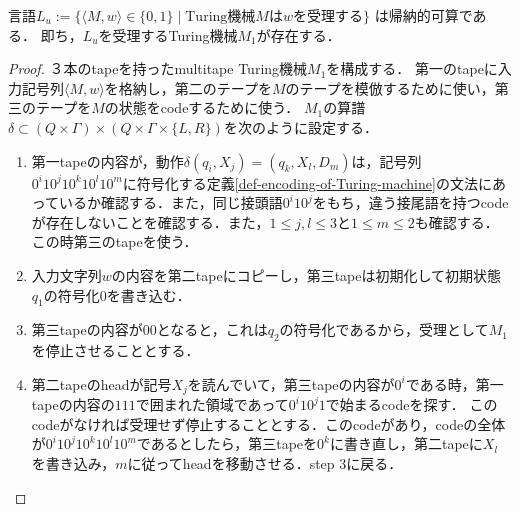 \documentclass[uplatex, dvipdfmx]{jsreport}
\begin{document}
\begin{theorem}[万能Turing機械の構成]\label{thm-existence-of-universal-Turing-machine}
    言語$L_u:=\{\langle M,w\rangle\in\{0,1\}\mid\mathrm{Turing}機械Mはwを受理する\}$
    は帰納的可算である．
    即ち，$L_u$を受理するTuring機械$M_1$が存在する．
\end{theorem}
\begin{proof}
    ３本のtapeを持ったmultitape Turing機械$M_1$を構成する．
    第一のtapeに入力記号列$\langle M,w\rangle$を格納し，第二のテープを$M$のテープを模倣するために使い，第三のテープを$M$の状態をcodeするために使う．
    $M_1$の算譜$\delta\subset (Q\times\Gamma)\times(Q\times\Gamma\times\{L,R\})$を次のように設定する．
    \begin{enumerate}
        \item 第一tapeの内容が，動作$\delta(q_i,X_j)=(q_k,X_l,D_m)$は，記号列$0^i10^j10^k10^l10^m$に符号化する定義\ref{def-encoding-of-Turing-machine}の文法にあっているか確認する．また，同じ接頭語$0^i10^j$をもち，違う接尾語を持つcodeが存在しないことを確認する．また，$1\le j,l\le 3$と$1\le m\le 2$も確認する．この時第三のtapeを使う．
        \item 入力文字列$w$の内容を第二tapeにコピーし，第三tapeは初期化して初期状態$q_1$の符号化$0$を書き込む．
        \item 第三tapeの内容が$00$となると，これは$q_2$の符号化であるから，受理として$M_1$を停止させることとする．
        \item 第二tapeのheadが記号$X_j$を読んでいて，第三tapeの内容が$0^i$である時，第一tapeの内容の$111$で囲まれた領域であって$0^i10^j1$で始まるcodeを探す．
        このcodeがなければ受理せず停止することとする．このcodeがあり，codeの全体が$0^i10^j10^k10^l10^m$であるとしたら，第三tapeを$0^k$に書き直し，第二tapeに$X_l$を書き込み，$m$に従ってheadを移動させる．step 3に戻る．
    \end{enumerate}
\end{proof}
\end{document}
